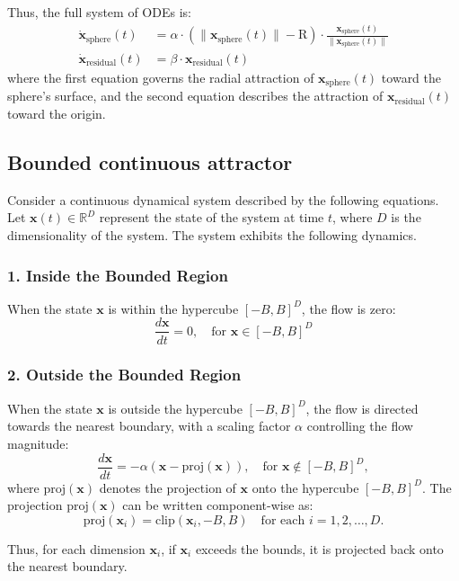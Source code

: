 \documentclass{article}
\theoremstyle{definition} \newtheorem{definition}{Definition}  \newtheorem{example}{Example}
\theoremstyle{remark} \newtheorem{remark}{Remark}
\newcounter{ct}
\begin{document}
Thus, the full system of ODEs is:
\[
\begin{aligned}
\dot{\mathbf{x}}_{\text{sphere}}(t) &= \alpha \cdot \left( \| \mathbf{x}_{\text{sphere}}(t) \| - \text{R} \right) \cdot \frac{\mathbf{x}_{\text{sphere}}(t)}{\|\mathbf{x}_{\text{sphere}}(t)\|} \\
\dot{\mathbf{x}}_{\text{residual}}(t) &= \beta \cdot \mathbf{x}_{\text{residual}}(t)
\end{aligned}
\]
where the first equation governs the radial attraction of \( \mathbf{x}_{\text{sphere}}(t) \) toward the sphere's surface, and the second equation describes the attraction of \( \mathbf{x}_{\text{residual}}(t) \) toward the origin.


\subsection{Bounded continuous attractor}\label{sec:bca}
Consider a continuous dynamical system described by the following equations. Let \( \mathbf{x}(t) \in \mathbb{R}^D \) represent the state of the system at time \( t \), where \( D \) is the dimensionality of the system.
The system exhibits the following dynamics.

\subsubsection*{1. Inside the Bounded Region}
When the state \( \mathbf{x} \) is within the hypercube \( [-B, B]^D \), the flow is zero:
\[
\frac{d \mathbf{x}}{dt} = 0, \quad \text{for } \mathbf{x} \in [-B, B]^D
\]

\subsubsection*{2. Outside the Bounded Region}
When the state \( \mathbf{x} \) is outside the hypercube \( [-B, B]^D \), the flow is directed towards the nearest boundary, with a scaling factor \( \alpha \) controlling the flow magnitude:
\[
\frac{d \mathbf{x}}{dt} = -\alpha (\mathbf{x} - \text{proj}(\mathbf{x})), \quad \text{for } \mathbf{x} \notin [-B, B]^D,
\]
where \( \text{proj}(\mathbf{x}) \) denotes the projection of \( \mathbf{x} \) onto the hypercube \( [-B, B]^D \). The projection \( \text{proj}(\mathbf{x}) \) can be written component-wise as:
\[
\text{proj}(\mathbf{x}_i) = \text{clip}(\mathbf{x}_i, -B, B) \quad \text{for each } i = 1, 2, \dots, D.
\]

Thus, for each dimension \( \mathbf{x}_i \), if \( \mathbf{x}_i \) exceeds the bounds, it is projected back onto the nearest boundary.
\end{document}
